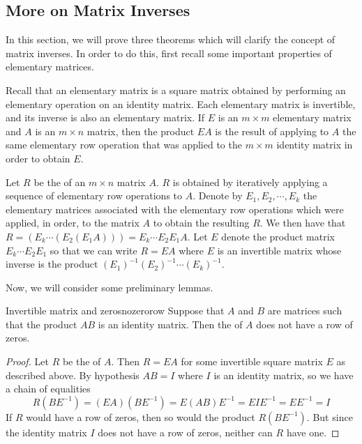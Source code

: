 \subsection{More on Matrix Inverses}

In this section, we will prove three theorems which will clarify the concept of matrix inverses. In order to do this, first recall some important properties of elementary matrices. 

Recall that an elementary matrix is a square matrix obtained by performing an elementary operation on an identity matrix. Each elementary matrix is invertible, and its inverse is also an elementary matrix. If $E$ is an $m \times m$ elementary matrix and $A$ is an $m \times n$ matrix, then the product $EA$ is the result of applying to $A$ the same elementary row operation that was applied to the $m \times m$ identity matrix in order to obtain $E$.

Let $R$ be the {\rref} of an $m \times n$ matrix $A$. $R$ is obtained by iteratively applying a sequence of elementary row operations to $A$. Denote by $E_1, E_2, \cdots, E_k$ the elementary matrices associated with the elementary row operations which were applied, in order, to the matrix $A$ to obtain the resulting $R$. We then have that $R = \left( E_k \cdots \left( E_2 \left( E_1A \right) \right)\right) = E_k \cdots E_2E_1A$. Let $E$ denote the product matrix $E_k \cdots E_2E_1$ so that we can write $R=EA$ where $E$ is an invertible matrix whose inverse is the product $(E_1)^{-1}(E_2)^{-1} \cdots (E_k)^{-1}$.

Now, we will consider some preliminary lemmas. 

\begin{lemma}{Invertible matrix and zeros}{nozerorow}
Suppose that $A$ and $B$ are matrices such that the product $AB$ is an identity matrix. Then the {\rref} of $A$ does not have a row of zeros.
\end{lemma}

\begin{proof}
Let $R$ be the {\rref} of $A$. Then $R=EA$ for some invertible square matrix $E$ as described above. By hypothesis $AB=I$ where $I$ is an identity matrix, so we have a chain of equalities
\begin{equation*}
R(BE^{-1})
=
(EA)(BE^{-1})
=
E(AB)E^{-1}
=
EIE^{-1}
=
EE^{-1}
=
I
\end{equation*}
If $R$ would have a row of zeros, then so would the product $R(BE^{-1})$. But since the identity matrix $I$ does not have a row of zeros, neither can $R$ have one.
\end{proof}

